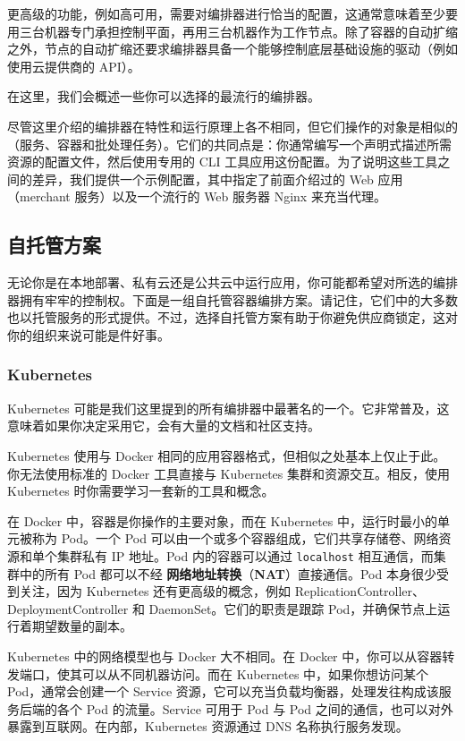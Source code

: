 更高级的功能，例如高可用，需要对编排器进行恰当的配置，这通常意味着至少要用三台机器专门承担控制平面，再用三台机器作为工作节点。除了容器的自动扩缩之外，节点的自动扩缩还要求编排器具备一个能够控制底层基础设施的驱动（例如使用云提供商的 API）。

在这里，我们会概述一些你可以选择的最流行的编排器。

尽管这里介绍的编排器在特性和运行原理上各不相同，但它们操作的对象是相似的（服务、容器和批处理任务）。它们的共同点是：你通常编写一个声明式描述所需资源的配置文件，然后使用专用的 CLI 工具应用这份配置。为了说明这些工具之间的差异，我们提供一个示例配置，其中指定了前面介绍过的 Web 应用（merchant 服务）以及一个流行的 Web 服务器 Nginx 来充当代理。

\subsection{自托管方案}

\label{idx:1801}
\label{idx:1802}
无论你是在本地部署、私有云还是公共云中运行应用，你可能都希望对所选的编排器拥有牢牢的控制权。下面是一组自托管容器编排方案。请记住，它们中的大多数也以托管服务的形式提供。不过，选择自托管方案有助于你避免供应商锁定，这对你的组织来说可能是件好事。

\subsubsection{Kubernetes}

\label{idx:1803}
Kubernetes 可能是我们这里提到的所有编排器中最著名的一个。它非常普及，这意味着如果你决定采用它，会有大量的文档和社区支持。

\label{idx:1804}
Kubernetes 使用与 Docker 相同的应用容器格式，但相似之处基本上仅止于此。你无法使用标准的 Docker 工具直接与 Kubernetes 集群和资源交互。相反，使用 Kubernetes 时你需要学习一套新的工具和概念。

\label{idx:1805}
\label{idx:1806}
在 Docker 中，容器是你操作的主要对象，而在 Kubernetes 中，运行时最小的单元被称为 Pod。一个 Pod 可以由一个或多个容器组成，它们共享存储卷、网络资源和单个集群私有 IP 地址。Pod 内的容器可以通过 \texttt{localhost} 相互通信，而集群中的所有 Pod 都可以不经 \textbf{网络地址转换}（\textbf{NAT}）直接通信。Pod 本身很少受到关注，因为 Kubernetes 还有更高级的概念，例如 ReplicationController、DeploymentController 和 DaemonSet。它们的职责是跟踪 Pod，并确保节点上运行着期望数量的副本。

Kubernetes 中的网络模型也与 Docker 大不相同。在 Docker 中，你可以从容器转发端口，使其可以从不同机器访问。而在 Kubernetes 中，如果你想访问某个 Pod，通常会创建一个 Service 资源，它可以充当负载均衡器，处理发往构成该服务后端的各个 Pod 的流量。Service 可用于 Pod 与 Pod 之间的通信，也可以对外暴露到互联网。在内部，Kubernetes 资源通过 DNS 名称执行服务发现。

